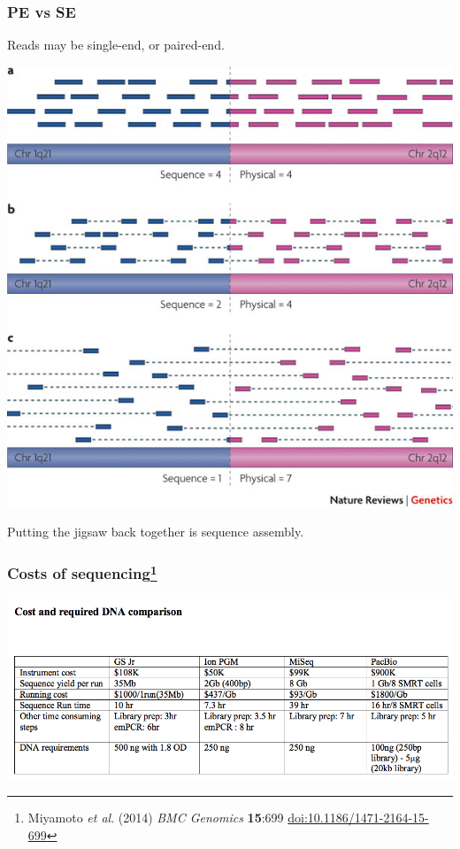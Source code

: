 \begin{frame}
  \frametitle{PE vs SE}
  Reads may be single-end, or paired-end.
  \begin{center}
    \includegraphics[height=0.6\textheight]{images/pe_vs_se}
  \end{center}      
  Putting the jigsaw back together is sequence assembly.
\end{frame}

\begin{frame}
  \frametitle{Costs of sequencing\footnote{\tiny{Miyamoto \textit{et al}. (2014) \textit{BMC Genomics} \textbf{15}:699 \href{http://dx.doi.org/10.1186/1471-2164-15-699}{doi:10.1186/1471-2164-15-699}}}}
    \begin{center}
      \includegraphics[width=1\textwidth]{images/miyamoto_costs}
    \end{center}      
\end{frame}

